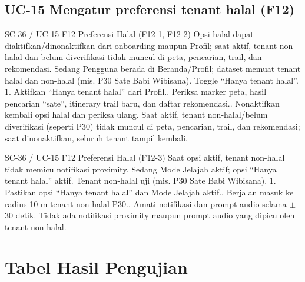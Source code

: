 \subsection*{UC-15 Mengatur preferensi tenant halal (F12)}

\renewcommand{\tcactual}{Sesuai ekspektasi pada perangkat Android (Lolos via \texttt{halal.test.ts}). Saat aktif, tenant non-halal/belum diverifikasi (seperti P30) tidak muncul di peta, pencarian, trail, dan rekomendasi; saat dinonaktifkan, seluruh tenant tampil kembali.}
{SC-36 / UC-15}
{F12 Preferensi Halal}
{(F12-1, F12-2) Opsi halal dapat diaktifkan/dinonaktifkan dari onboarding maupun Profil; saat aktif, tenant non-halal dan belum diverifikasi tidak muncul di peta, pencarian, trail, dan rekomendasi.}
{Sedang}
{Pengguna berada di Beranda/Profil; dataset memuat tenant halal dan non-halal (mis. P30 Sate Babi Wibisana).}
{Toggle ``Hanya tenant halal''.}
{1. Aktifkan ``Hanya tenant halal'' dari Profil.. Periksa marker peta, hasil pencarian ``sate'', itinerary trail baru, dan daftar rekomendasi.. Nonaktifkan kembali opsi halal dan periksa ulang.}
{Saat aktif, tenant non-halal/belum diverifikasi (seperti P30) tidak muncul di peta, pencarian, trail, dan rekomendasi; saat dinonaktifkan, seluruh tenant tampil kembali.}

\renewcommand{\tcactual}{Sesuai ekspektasi pada perangkat Android (Lolos via \texttt{halal.test.ts}). Tidak ada notifikasi proximity maupun prompt audio yang dipicu oleh tenant non-halal.}
{SC-36 / UC-15}
{F12 Preferensi Halal}
{(F12-3) Saat opsi aktif, tenant non-halal tidak memicu notifikasi proximity.}
{Sedang}
{Mode Jelajah aktif; opsi ``Hanya tenant halal'' aktif.}
{Tenant non-halal uji (mis. P30 Sate Babi Wibisana).}
{1. Pastikan opsi ``Hanya tenant halal'' dan Mode Jelajah aktif.. Berjalan masuk ke radius 10 m tenant non-halal P30.. Amati notifikasi dan prompt audio selama \(\pm\)30 detik.}
{Tidak ada notifikasi proximity maupun prompt audio yang dipicu oleh tenant non-halal.}

\section{Tabel Hasil Pengujian}

\newcommand{\resulthead}[1]{%
\begin{longtable}{|C{0.10}|L{0.23}|L{0.29}|L{0.25}|L{0.13}|}
\caption{Hasil Pengujian Alpha: #1}\\
\hline
\cellcolor[HTML]{D9EAF7}\textbf{TC ID} & \cellcolor[HTML]{D9EAF7}\textbf{Test Case} & \cellcolor[HTML]{D9EAF7}\textbf{Hasil yang Diharapkan} & \cellcolor[HTML]{D9EAF7}\textbf{Hasil Aktual} & \cellcolor[HTML]{D9EAF7}\textbf{Status} \\ \hline
\endfirsthead
\hline
\cellcolor[HTML]{D9EAF7}\textbf{TC ID} & \cellcolor[HTML]{D9EAF7}\textbf{Test Case} & \cellcolor[HTML]{D9EAF7}\textbf{Hasil yang Diharapkan} & \cellcolor[HTML]{D9EAF7}\textbf{Hasil Aktual} & \cellcolor[HTML]{D9EAF7}\textbf{Status} \\ \hline
\endhead
}

